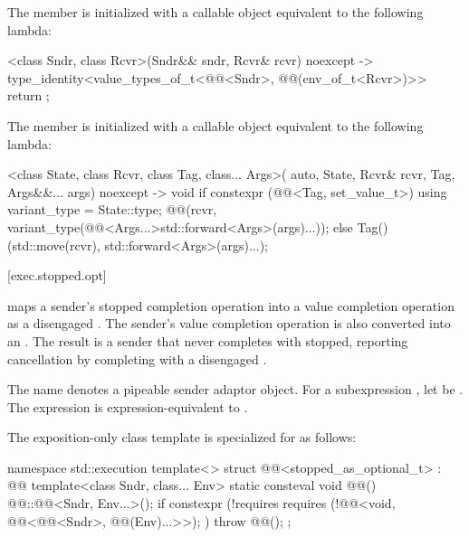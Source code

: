 \pnum
The member 
is initialized with a callable object equivalent to the following lambda:
\begin{codeblock}
[]<class Sndr, class Rcvr>(Sndr&& sndr, Rcvr& rcvr) noexcept
  -> type_identity<value_types_of_t<@@<Sndr>, @@(env_of_t<Rcvr>)>> {
  return {};
}
\end{codeblock}

\pnum
The member 
is initialized with a callable object equivalent to the following lambda:
\begin{codeblock}
[]<class State, class Rcvr, class Tag, class... Args>(
    auto, State, Rcvr& rcvr, Tag, Args&&... args) noexcept -> void {
  if constexpr (@@<Tag, set_value_t>) {
    using variant_type = State::type;
    @@(rcvr, variant_type(@@<Args...>{std::forward<Args>(args)...}));
  } else {
    Tag()(std::move(rcvr), std::forward<Args>(args)...);
  }
}
\end{codeblock}

[exec.stopped.opt]{}

\pnum
{} maps a sender's stopped completion operation
into a value completion operation as a disengaged .
The sender's value completion operation
is also converted into an .
The result is a sender that never completes with stopped,
reporting cancellation by completing with a disengaged .

\pnum
The name  denotes a pipeable sender adaptor object.
For a subexpression , let  be .
The expression  is expression-equivalent to
.

\pnum
The exposition-only class template 
is specialized for  as follows:
\begin{codeblock}
namespace std::execution {
  template<>
  struct @@<stopped_as_optional_t> : @@ {
    template<class Sndr, class... Env>
      static consteval void @@() {
        @@::@@<Sndr, Env...>();
        if constexpr (!requires {
          requires (!@@<void, @@<@@<Sndr>,
                                                            @@(Env)...>>); })
          throw @@();
      }
  };
}
\end{codeblock}

